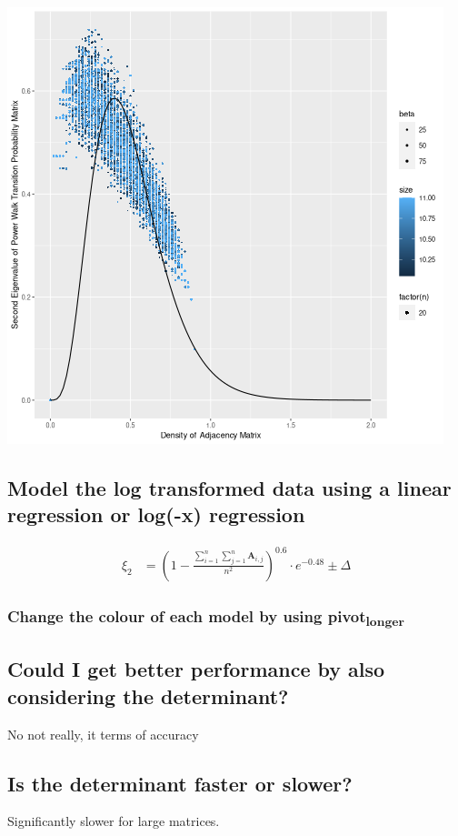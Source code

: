 \documentclass[11pt]{article}
\begin{document}
\begin{center}
\includegraphics[width=.9\linewidth]{../Media/EigenValue_Density_Chi.png}
\end{center}

\subsection{Model the log transformed data using a linear regression or log(-x) regression}
\label{sec:org42fba6f}

\begin{align}
    \xi_2 &= \left( 1-  \frac{\sum^{n}_{i= 1} \sum^{n}_{j= 1}   \mathbf{A}_{i,j}  }{n^{2}} \right)^{0.6} \cdot  e^{- 0.48} \pm \Delta
\end{align}

\subsubsection{Change the colour of each model by using pivot\textsubscript{longer}}
\label{sec:org0645a1d}
\subsection{Could I get better performance by also considering the determinant?}
\label{sec:org1679814}
No not really, it terms of accuracy

\subsection{Is the determinant faster or slower?}
\label{sec:org93a75a6}
Significantly slower for large matrices.
\end{document}
